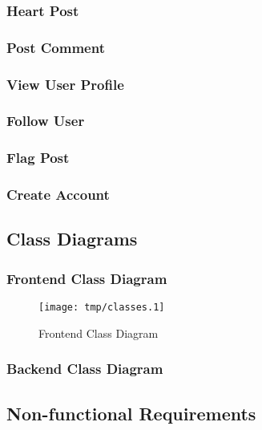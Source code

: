         \subsubsection{Heart Post}
        \subsubsection{Post Comment}
        \subsubsection{View User Profile}
        \subsubsection{Follow User}
        \subsubsection{Flag Post}
        \subsubsection{Create Account}


    \subsection{Class Diagrams}
        \subsubsection{Frontend Class Diagram}
            \begin{figure}[H]
                \centering
                \texttt{[image: tmp/classes.1]} 
                \caption{Frontend Class Diagram}
            \end{figure}

        \subsubsection{Backend Class Diagram}

    \subsection{Non-functional Requirements}

